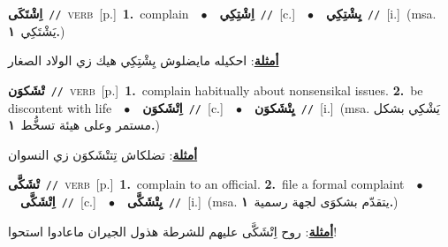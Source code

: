 \documentclass[10pt,a4paper,twoside]{article} %
\begin{document}
\begin{multicols}{2}
{\setlength\topsep{0pt}\textbf{\foreignlanguage{arabic}{اِشْتَكَى}}\ {\color{gray}\texttt{//}\color{black}}\ \textsc{verb}\ [p.]\ \textbf{1.}~complain\ \ $\bullet$\ \ \setlength\topsep{0pt}\textbf{\foreignlanguage{arabic}{اِشْتِكِي}}\ {\color{gray}\texttt{//}\color{black}}\ [c.]\ \ $\bullet$\ \ \setlength\topsep{0pt}\textbf{\foreignlanguage{arabic}{يِشْتِكِي}}\ {\color{gray}\texttt{//}\color{black}}\ [i.]\ \color{gray}(msa. \foreignlanguage{arabic}{يَشْتَكِي}~\foreignlanguage{arabic}{\textbf{١.}})\color{black}\  \begin{flushright}\color{gray}\foreignlanguage{arabic}{\textbf{\underline{\foreignlanguage{arabic}{أمثلة}}}: احكيله مايضلوش يِشْتِكِي هيك زي الولاد الصغار}\end{flushright}\color{black}} \vspace{2mm}

{\setlength\topsep{0pt}\textbf{\foreignlanguage{arabic}{تْشَكوَن}}\ {\color{gray}\texttt{//}\color{black}}\ \textsc{verb}\ [p.]\ \textbf{1.}~complain habitually about nonsensikal issues.  \textbf{2.}~be discontent with life\ \ $\bullet$\ \ \setlength\topsep{0pt}\textbf{\foreignlanguage{arabic}{اِتْشَكوَن}}\ {\color{gray}\texttt{//}\color{black}}\ [c.]\ \ $\bullet$\ \ \setlength\topsep{0pt}\textbf{\foreignlanguage{arabic}{يِتْشَكوَن}}\ {\color{gray}\texttt{//}\color{black}}\ [i.]\ \color{gray}(msa. \foreignlanguage{arabic}{يَشْكِي بشكل مستمر وعلى هيئة تسخُّط}~\foreignlanguage{arabic}{\textbf{١.}})\color{black}\  \begin{flushright}\color{gray}\foreignlanguage{arabic}{\textbf{\underline{\foreignlanguage{arabic}{أمثلة}}}: تضلكاش تِتتْشَكوَن زي النسوان}\end{flushright}\color{black}} \vspace{2mm}

{\setlength\topsep{0pt}\textbf{\foreignlanguage{arabic}{تْشَكَّى}}\ {\color{gray}\texttt{//}\color{black}}\ \textsc{verb}\ [p.]\ \textbf{1.}~complain to an official.  \textbf{2.}~file a formal complaint\ \ $\bullet$\ \ \setlength\topsep{0pt}\textbf{\foreignlanguage{arabic}{اِتْشَكَّى}}\ {\color{gray}\texttt{//}\color{black}}\ [c.]\ \ $\bullet$\ \ \setlength\topsep{0pt}\textbf{\foreignlanguage{arabic}{يِتْشَكَّى}}\ {\color{gray}\texttt{//}\color{black}}\ [i.]\ \color{gray}(msa. \foreignlanguage{arabic}{يتقدّم بشكوَى لجهة رسمية}~\foreignlanguage{arabic}{\textbf{١.}})\color{black}\  \begin{flushright}\color{gray}\foreignlanguage{arabic}{\textbf{\underline{\foreignlanguage{arabic}{أمثلة}}}: روح اِتْشَكَّى عليهم للشرطة هذول الجيران ماعادوا استحوا!}\end{flushright}\color{black}} \vspace{2mm}


\end{multicols}
\end{document}
